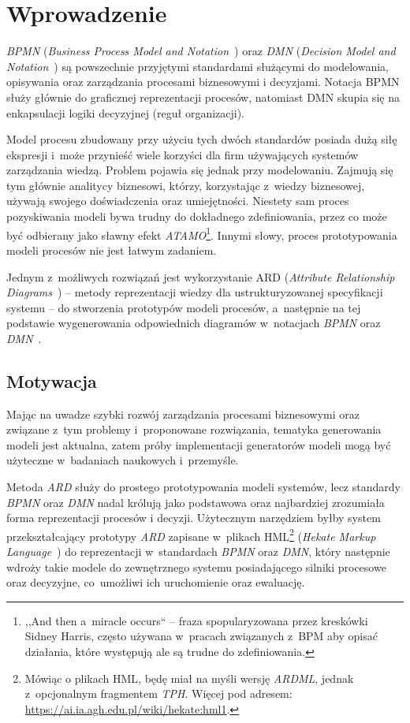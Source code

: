 \chapter{Wprowadzenie}
\label{cha:wprowadzenie}
 \emph{BPMN} (\emph{Business Process Model and Notation}~\cite{BPMN20}) oraz \emph{DMN} (\emph{Decision Model and Notation}~\cite{DMN12}) są powszechnie przyjętymi standardami służącymi do modelowania, opisywania oraz zarządzania procesami biznesowymi i decyzjami. Notacja BPMN służy głównie do graficznej reprezentacji procesów, natomiast DMN skupia się na enkapsulacji logiki decyzyjnej (reguł organizacji).

 Model procesu zbudowany przy użyciu tych dwóch standardów posiada dużą siłę ekspresji i~może przynieść wiele korzyści dla firm używających systemów zarządzania wiedzą. Problem pojawia się jednak przy modelowaniu. Zajmują się tym głównie analitycy biznesowi, którzy, korzystając z~wiedzy biznesowej, używają swojego doświadczenia oraz umiejętności. Niestety sam proces pozyskiwania modeli bywa trudny do dokładnego zdefiniowania, przez co może być odbierany jako sławny efekt \emph{ATAMO}\footnote{,,And then a~miracle occurs`` -- fraza spopularyzowana przez kreskówki Sidney Harris, często używana w~pracach związanych z~BPM aby opisać działania, które występują ale są trudne do zdefiniowania.}. Innymi słowy, proces prototypowania modeli procesów nie jest łatwym zadaniem. 

 Jednym z~możliwych rozwiązań jest wykorzystanie ARD (\emph{Attribute Relationship Diagrams}~\cite{ARD}) -- metody reprezentacji wiedzy dla ustrukturyzowanej specyfikacji systemu -- do stworzenia prototypów modeli procesów, a~następnie na tej podstawie wygenerowania odpowiednich diagramów w~notacjach \emph{BPMN} oraz \emph{DMN}~\cite{ARDtoBPM}. 


\section{Motywacja}
\label{sec:motywacja}
Mając na uwadze szybki rozwój zarządzania procesami biznesowymi oraz związane z~tym problemy i~proponowane rozwiązania, tematyka generowania modeli jest aktualna, zatem próby implementacji generatorów modeli mogą być użyteczne w~badaniach naukowych i~przemyśle. 

Metoda \emph{ARD} służy do prostego prototypowania modeli systemów, lecz standardy \emph{BPMN} oraz \emph{DMN} nadal królują jako podstawowa oraz najbardziej zrozumiała forma reprezentacji procesów i decyzji. Użytecznym narzędziem byłby system przekształcający prototypy \emph{ARD} zapisane w~plikach HML\footnote{Mówiąc o plikach HML, będę miał na myśli wersję \emph{ARDML}, jednak z~opcjonalnym fragmentem \emph{TPH}. Więcej pod adresem: \url{https://ai.ia.agh.edu.pl/wiki/hekate:hml1}.} (\emph{Hekate Markup Language}~\cite{HML}) do reprezentacji w~standardach \emph{BPMN} oraz \emph{DMN}, który następnie wdroży takie modele do zewnętrznego systemu posiadającego silniki procesowe oraz decyzyjne, co~umożliwi ich uruchomienie oraz ewaluację.

